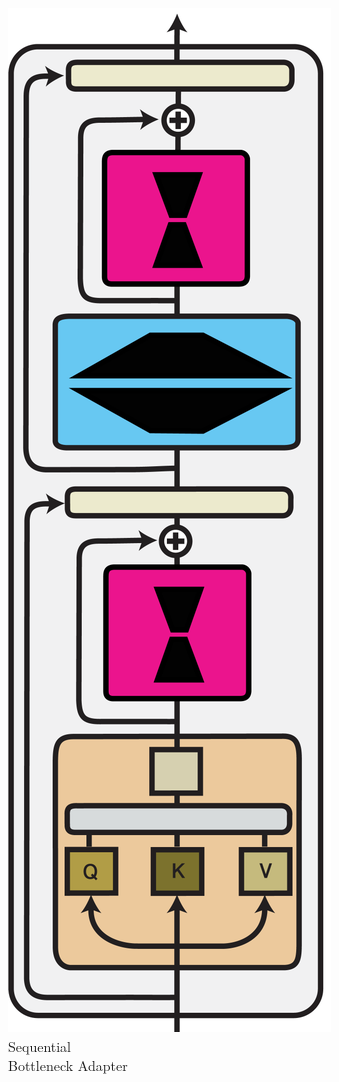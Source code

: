 \documentclass[10pt]{article} %
\begin{document}
\begin{figure}[t]
    \centering
    \begin{subfigure}[b]{.2\linewidth}
    \centering
        \vspace{3em}
        \includegraphics[width=.5\linewidth]{img/Bottleneck_adapter.pdf}
        \vspace{0.4em}
        \caption{Sequential \\ Bottleneck Adapter}
        \label{fig:nature_modularity:bottleneckadapter}
    \end{subfigure}
    \hspace{3em}
    \begin{subfigure}[b]{.3\linewidth}
    \centering
    \vspace{3em}

\end{subfigure}
\end{figure}
\end{document}
